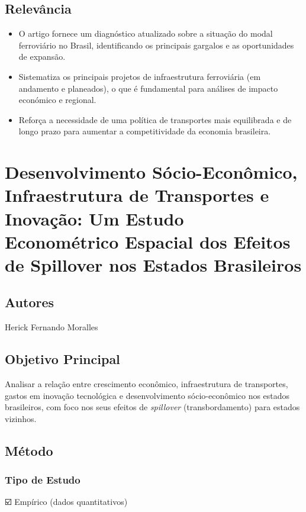 \documentclass[12pt]{article}
\begin{document}
\subsection*{Relevância}
\begin{itemize}
    \item O artigo fornece um diagnóstico atualizado sobre a situação do modal ferroviário no Brasil, identificando os principais gargalos e as oportunidades de expansão.
    \item Sistematiza os principais projetos de infraestrutura ferroviária (em andamento e planeados), o que é fundamental para análises de impacto económico e regional.
    \item Reforça a necessidade de uma política de transportes mais equilibrada e de longo prazo para aumentar a competitividade da economia brasileira.
\end{itemize}
\newpage

\section{Desenvolvimento Sócio-Econômico, Infraestrutura de Transportes e Inovação: Um Estudo Econométrico Espacial dos Efeitos de Spillover nos Estados Brasileiros}

\subsection*{Autores}
Herick Fernando Moralles

\subsection*{Objetivo Principal}
Analisar a relação entre crescimento econômico, infraestrutura de transportes, gastos em inovação tecnológica e desenvolvimento sócio-econômico nos estados brasileiros, com foco nos seus efeitos de \textit{spillover} (transbordamento) para estados vizinhos.

\subsection*{Método}

\subsubsection*{Tipo de Estudo}
☑️ Empírico (dados quantitativos)
\end{document}
